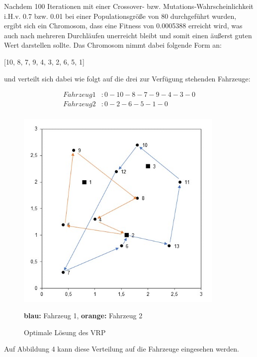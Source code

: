 \documentclass[a4paper,12pt,parskip,bibtotoc,liststotoc]{article}
\begin{document}
Nachdem 100 Iterationen mit einer Crossover- bzw. Mutations-Wahrscheinlichkeit i.H.v. 0.7 bzw. 0.01 bei einer Populationsgröße von 80 durchgeführt wurden, ergibt sich ein Chromosom, dass eine Fitness von 0.0005388 erreicht wird, was auch nach mehreren Durchläufen unerreicht bleibt und somit einen äußerst guten Wert darstellen sollte.
Das Chromosom nimmt dabei folgende Form an: 

\begin{center}
[10, 8, 7, 9, 4, 3, 2, 6, 5, 1]
\end{center}

und verteilt sich dabei wie folgt auf die drei zur Verfügung stehenden Fahrzeuge: 


\begin{equation} \label{eq:test}
    \begin{aligned} 
         Fahrzeug 1&: 0 - 10 - 8 - 7 - 9 - 4 - 3 - 0 \\
        Fahrzeug 2&: 0 - 2 - 6 - 5 - 1 - 0\\
    \end{aligned}
\end{equation}


\begin{figure}[h!]
  \begin{center}
    \includegraphics[width=100mm]{vrp222.jpg}
    \caption{Optimale Lösung des VRP}  \label{Typen}
	{\footnotesize \textbf{blau:} Fahrzeug 1, \textbf{orange:} Fahrzeug 2}
  \end{center}
\end{figure}


Auf Abbildung 4 kann diese Verteilung auf die Fahrzeuge eingesehen werden.\\
\end{document}
